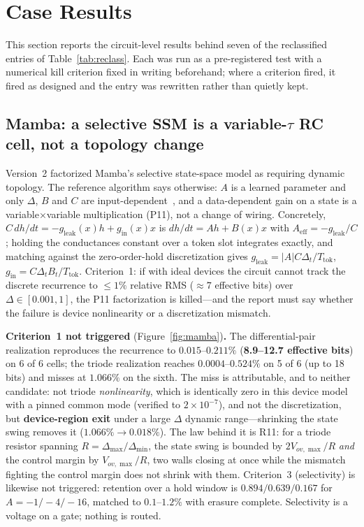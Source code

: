 \documentclass[11pt]{article}
\begin{document}
\section{Case Results}
\label{sec:cases}

This section reports the circuit-level results behind seven of the reclassified entries of Table~\ref{tab:reclass}. Each was run as a pre-registered test with a numerical kill criterion fixed in writing beforehand; where a criterion fired, it fired as designed and the entry was rewritten rather than quietly kept.

\subsection{Mamba: a selective SSM is a variable-$\tau$ RC cell, not a topology change}
\label{sec:mamba}

Version~2 factorized Mamba's selective state-space model as requiring dynamic topology. The reference algorithm says otherwise: $A$ is a learned parameter and only $\Delta$, $B$ and $C$ are input-dependent~\cite{gu2023mamba}, and a data-dependent gain on a state is a variable$\times$variable multiplication (P11), not a change of wiring. Concretely, $C\,dh/dt = -g_{\mathrm{leak}}(x)h + g_{\mathrm{in}}(x)x$ is $dh/dt = Ah + B(x)x$ with $A_{\mathrm{eff}} = -g_{\mathrm{leak}}/C$; holding the conductances constant over a token slot integrates exactly, and matching against the zero-order-hold discretization gives $g_{\mathrm{leak}} = |A|C\Delta_t/T_{\mathrm{tok}}$, $g_{\mathrm{in}} = C\Delta_t B_t/T_{\mathrm{tok}}$. Criterion~1: if with ideal devices the circuit cannot track the discrete recurrence to $\le1\%$ relative RMS (${\approx}7$ effective bits) over $\Delta\in[0.001,1]$, the P11 factorization is killed---and the report must say whether the failure is device nonlinearity or a discretization mismatch.

\textbf{Criterion~1 not triggered} (Figure~\ref{fig:mamba})\textbf{.} The differential-pair realization reproduces the recurrence to $0.015$--$0.211\%$ (\textbf{8.9--12.7 effective bits}) on 6 of 6 cells; the triode realization reaches $0.0004$--$0.524\%$ on 5 of 6 (up to 18 bits) and misses at $1.066\%$ on the sixth. The miss is attributable, and to neither candidate: not triode \textit{nonlinearity}, which is identically zero in this device model with a pinned common mode (verified to $2\times10^{-7}$), and not the discretization, but \textbf{device-region exit} under a large $\Delta$ dynamic range---shrinking the state swing removes it ($1.066\% \to 0.018\%$). The law behind it is R11: for a triode resistor spanning $R = \Delta_{\max}/\Delta_{\min}$, the state swing is bounded by $2V_{ov,\max}/R$ \textit{and} the control margin by $V_{ov,\max}/R$, two walls closing at once while the mismatch fighting the control margin does not shrink with them. Criterion~3 (selectivity) is likewise not triggered: retention over a hold window is $0.894/0.639/0.167$ for $A=-1/-4/-16$, matched to $0.1$--$1.2\%$ with erasure complete. Selectivity is a voltage on a gate; nothing is routed.
\end{document}
